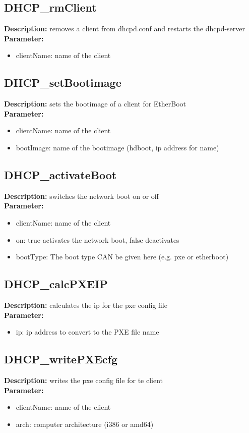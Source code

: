 \subsection{DHCP\_rmClient}
\textbf{Description:} removes a client from dhcpd.conf and restarts the dhcpd-server\\
\textbf{Parameter:}
\begin{itemize}
\item clientName: name of the client
\end{itemize}

\subsection{DHCP\_setBootimage}
\textbf{Description:} sets the bootimage of a client for EtherBoot\\
\textbf{Parameter:}
\begin{itemize}
\item clientName: name of the client
\item bootImage: name of the bootimage (hdboot, ip address for name)
\end{itemize}

\subsection{DHCP\_activateBoot}
\textbf{Description:} switches the network boot on or off\\
\textbf{Parameter:}
\begin{itemize}
\item clientName: name of the client
\item on: true activates the network boot, false deactivates
\item bootType: The boot type CAN be given here (e.g. pxe or etherboot)
\end{itemize}

\subsection{DHCP\_calcPXEIP}
\textbf{Description:} calculates the ip for the pxe config file\\
\textbf{Parameter:}
\begin{itemize}
\item ip: ip address to convert to the PXE file name
\end{itemize}

\subsection{DHCP\_writePXEcfg}
\textbf{Description:} writes the pxe config file for te client\\
\textbf{Parameter:}
\begin{itemize}
\item clientName: name of the client
\item arch: computer architecture (i386 or amd64)
\end{itemize}

